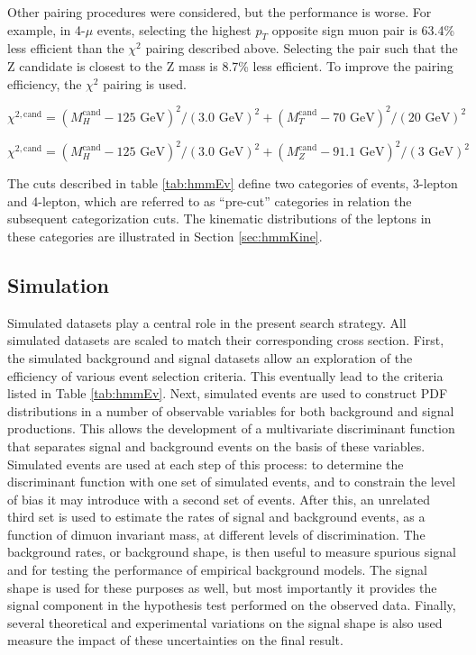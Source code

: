 Other pairing procedures were considered, but the performance is worse. For example, in 4-$\mu$ events, selecting the highest $p_T$ opposite sign muon pair is 63.4\% less efficient than the $\chi^2$ pairing described above. Selecting the pair such that the Z candidate is closest to the Z mass is 8.7\% less efficient. To improve the pairing efficiency, the $\chi^2$ pairing is used.

\begin{equation}
  \label{eq:hmmWhPairing}
  \chi^{2,\text{cand}} = (M_H^\text{cand}-125\text{ GeV})^2/(3.0\text{ GeV})^2 + (M_T^\text{cand}-70\text{ GeV} )^2/(20\text{ GeV})^2
\end{equation}

\begin{equation}
  \label{eq:hmmZhPairing}
  \chi^{2,\text{cand}} = (M_H^\text{cand}-125\text{ GeV})^2/(3.0\text{ GeV})^2 + (M_Z^\text{cand}-91.1\text{ GeV} )^2/(3\text{ GeV})^2
\end{equation}

The cuts described in table \ref{tab:hmmEv} define two categories of events, 3-lepton and 4-lepton, which are referred to as ``pre-cut'' categories in relation the subsequent categorization cuts.
The kinematic distributions of the leptons in these categories are illustrated in Section \ref{sec:hmmKine}.


\subsection{Simulation}\label{sec:hmmSim}

Simulated datasets play a central role in the present search strategy.
All simulated datasets are scaled to match their corresponding cross section.
First, the simulated background and signal datasets allow an exploration of the efficiency of various event selection criteria.
This eventually lead to the criteria listed in Table \ref{tab:hmmEv}.
Next, simulated events are used to construct PDF distributions in a number of observable variables for both background and signal productions.
This allows the development of a multivariate discriminant function that separates signal and background events on the basis of these variables.
Simulated events are used at each step of this process: to determine the discriminant function with one set of simulated events, and to constrain the level of bias it may introduce with a second set of events.
After this, an unrelated third set is used to estimate the rates of signal and background events, as a function of dimuon invariant mass, at different levels of discrimination.
The background rates, or background shape, is then useful to measure spurious signal and for testing the performance of empirical background models.
The signal shape is used for these purposes as well, but most importantly it provides the signal component in the hypothesis test performed on the observed data.
Finally, several theoretical and experimental variations on the signal shape is also used measure the impact of these uncertainties on the final result.

